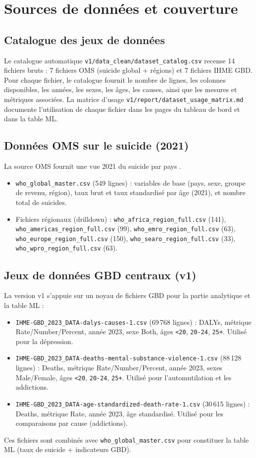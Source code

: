 \chapter{Sources de données et couverture}
\section{Catalogue des jeux de données}
Le catalogue automatique \texttt{v1/data\_clean/dataset\_catalog.csv} recense 14 fichiers bruts : 7 fichiers OMS (suicide global + régions) et 7 fichiers IHME GBD. Pour chaque fichier, le catalogue fournit le nombre de lignes, les colonnes disponibles, les années, les sexes, les âges, les causes, ainsi que les mesures et métriques associées. La matrice d'usage \texttt{v1/report/dataset\_usage\_matrix.md} documente l'utilisation de chaque fichier dans les pages du tableau de bord et dans la table ML.

\section{Données OMS sur le suicide (2021)}
La source OMS fournit une vue 2021 du suicide par pays \cite{who_suicide_2021}.
\begin{itemize}
    \item \texttt{who\_global\_master.csv} (549 lignes) : variables de base (pays, sexe, groupe de revenu, région), taux brut et taux standardisé par âge (2021), et nombre total de suicides.
    \item Fichiers régionaux (drilldown) : \texttt{who\_africa\_region\_full.csv} (141), \texttt{who\_americas\_region\_full.csv} (99), \texttt{who\_emro\_region\_full.csv} (63), \texttt{who\_europe\_region\_full.csv} (150), \texttt{who\_searo\_region\_full.csv} (33), \texttt{who\_wpro\_region\_full.csv} (63).
\end{itemize}

\section{Jeux de données GBD centraux (v1)}
La version v1 s'appuie sur un noyau de fichiers GBD pour la partie analytique et la table ML \cite{ihme_gbd_2023} :
\begin{itemize}
    \item \texttt{IHME-GBD\_2023\_DATA-dalys-causes-1.csv} (69\,768 lignes) : DALYs, métrique Rate/Number/Percent, année 2023, sexe Both, âges \texttt{<20}, \texttt{20-24}, \texttt{25+}. Utilisé pour la dépression.
    \item \texttt{IHME-GBD\_2023\_DATA-deaths-mental-substance-violence-1.csv} (88\,128 lignes) : Deaths, métrique Rate/Number/Percent, année 2023, sexes Male/Female, âges \texttt{<20}, \texttt{20-24}, \texttt{25+}. Utilisé pour l'automutilation et les addictions.
    \item \texttt{IHME-GBD\_2023\_DATA-age-standardized-death-rate-1.csv} (30\,615 lignes) : Deaths, métrique Rate, année 2023, âge standardisé. Utilisé pour les comparaisons par cause (addictions).
\end{itemize}
Ces fichiers sont combinés avec \texttt{who\_global\_master.csv} pour constituer la table ML (taux de suicide + indicateurs GBD).

